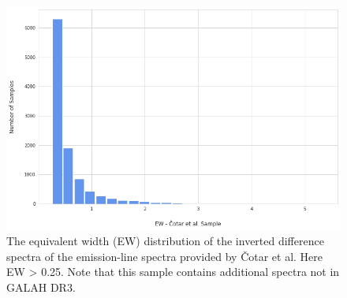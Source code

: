 \begin{figure}[!htb]
\centering
\includegraphics[scale=0.50]{figures/EW hist cotar.png}
\caption{The equivalent width (EW) distribution of the inverted difference spectra of the emission-line spectra provided by Čotar et al. Here EW > 0.25. Note that this sample contains additional spectra not in GALAH DR3.}
\end{figure}

